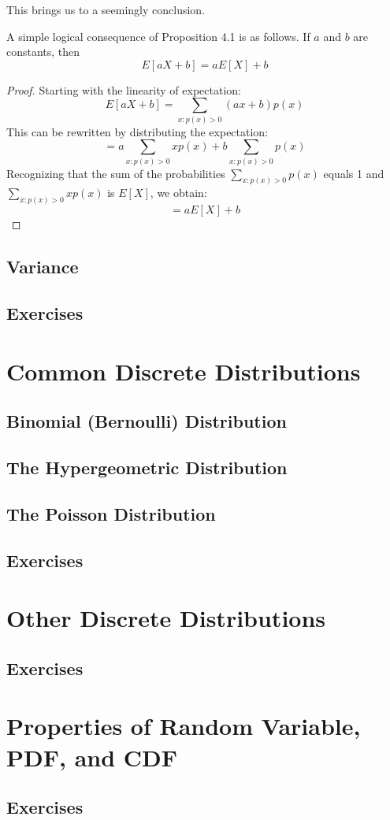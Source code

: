 This brings us to a seemingly conclusion.
\begin{corollary}
    A simple logical consequence of Proposition 4.1 is as follows. If \(a\) and \(b\) are constants, then
\[ E[aX + b] = aE[X] + b \]
\end{corollary}
\begin{proof}
    Starting with the linearity of expectation:
\[
E[aX + b] = \sum_{x:p(x)>0} (ax + b)p(x)
\]
This can be rewritten by distributing the expectation:
\[
= a \sum_{x:p(x)>0} xp(x) + b \sum_{x:p(x)>0} p(x)
\]
Recognizing that the sum of the probabilities \( \sum_{x:p(x)>0} p(x) \) equals 1 and \( \sum_{x:p(x)>0} xp(x) \) is \( E[X] \), we obtain:
\[
= aE[X] + b
\]
\end{proof}
\subsection{Variance}

\subsection{Exercises}

\section{Common Discrete Distributions}
\subsection{Binomial (Bernoulli) Distribution}
\subsection{The Hypergeometric Distribution}
\subsection{The Poisson Distribution}
\subsection{Exercises}

\section{Other Discrete Distributions}
\subsection{Exercises}

\section{Properties of Random Variable, PDF, and CDF}
\subsection{Exercises}



